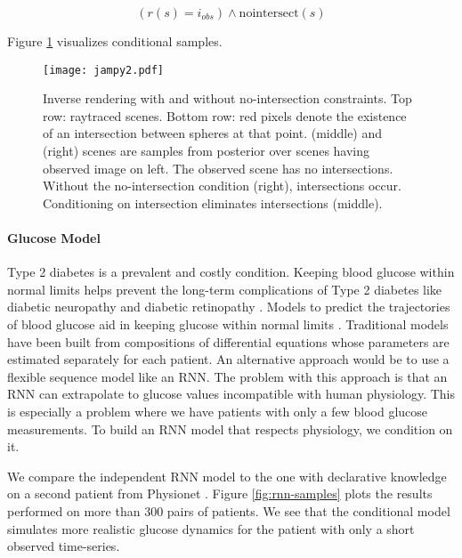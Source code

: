 \begin{equation}
(r(s) = i_{obs}) \land \textrm{nointersect}(s)
\end{equation}

Figure \ref{fig:invrtmcmc} visualizes conditional samples.

\begin{figure}
	\centering
	\texttt{[image: jampy2.pdf]}
	\caption{Inverse rendering with and without no-intersection constraints.  Top row: raytraced scenes.  Bottom row: red pixels denote the existence of an intersection between spheres at that point.  (middle) and (right) scenes are samples from posterior over scenes having observed image on left.  The observed scene has no intersections.  Without the no-intersection condition (right), intersections occur.  Conditioning on intersection eliminates intersections (middle).}
	\label{fig:invrtmcmc}
\end{figure}


\paragraph{Glucose Model}
Type 2 diabetes is a prevalent and costly condition.
Keeping blood glucose within normal limits helps prevent the
long-term complications of Type 2 diabetes like diabetic neuropathy and diabetic retinopathy \citep{brownlee2006glycemic}. Models to predict the trajectories of blood glucose aid in keeping glucose within
normal limits \citep{zeevi2015personalized}. Traditional models have been built from compositions of differential equations \citep{albers2017personalized,levine2017offline} whose parameters are estimated separately for each patient. An alternative approach would be to use a flexible sequence model like an RNN. The problem with this approach is that an RNN can extrapolate to glucose values incompatible with human physiology. This is especially a problem where we have patients with only a few blood glucose measurements. To build an RNN model that respects physiology, we condition on it.

We compare the independent RNN model to the one with declarative knowledge on a second patient from Physionet \citep{moody2001physionet}.
Figure \ref{fig:rnn-samples} plots the results performed on more than 300 pairs of patients.
We see that the conditional model simulates
more realistic glucose dynamics for the patient 
with only a short observed time-series.

